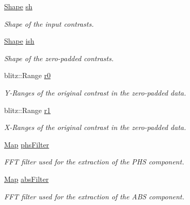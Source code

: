 \begin{DoxyCompactItemize}
\item 
\hyperlink{group__Types_ga777964671cb4315ce8c56c920db031e3}{Shape} \hyperlink{classIPCprocess_a3f789a5d26ee977c7763659d8a4e2e16}{sh}
\begin{DoxyCompactList}\small\item\em Shape of the input contrasts. \item\end{DoxyCompactList}\item 
\hyperlink{group__Types_ga777964671cb4315ce8c56c920db031e3}{Shape} \hyperlink{classIPCprocess_a87d6e0b5e4741d780734724f709c347c}{ish}
\begin{DoxyCompactList}\small\item\em Shape of the zero-\/padded contrasts. \item\end{DoxyCompactList}\item 
blitz::Range \hyperlink{classIPCprocess_a76e82f07d77804b10708a20597157eb8}{r0}
\begin{DoxyCompactList}\small\item\em Y-\/Ranges of the original contrast in the zero-\/padded data. \item\end{DoxyCompactList}\item 
blitz::Range \hyperlink{classIPCprocess_ac8a99daf63b477302d9eb16a93034b42}{r1}
\begin{DoxyCompactList}\small\item\em X-\/Ranges of the original contrast in the zero-\/padded data. \item\end{DoxyCompactList}\item 
\hyperlink{group__Types_ga8747378c016fc11d9ecbb98787248c25}{Map} \hyperlink{classIPCprocess_ad592cdc7e51918d1c5e255981bdd3091}{phsFilter}
\begin{DoxyCompactList}\small\item\em FFT filter used for the extraction of the PHS component. \item\end{DoxyCompactList}\item 
\hyperlink{group__Types_ga8747378c016fc11d9ecbb98787248c25}{Map} \hyperlink{classIPCprocess_ab459a389e61e45f1531ada8ea2fcb98e}{absFilter}
\begin{DoxyCompactList}\small\item\em FFT filter used for the extraction of the ABS component. \item\end{DoxyCompactList}\item 

\end{DoxyCompactItemize}
